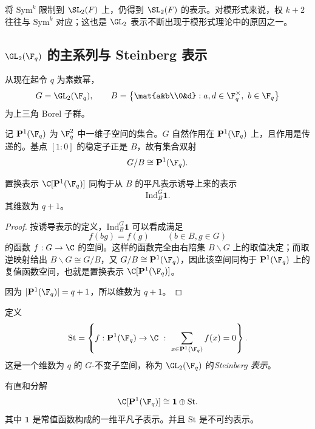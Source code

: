 \begin{remark}
将 $\mathrm{Sym}^k$ 限制到 $\SL_2(F)$ 上，仍得到 $\SL_2(F)$ 的表示。对模形式来说，权 $k+2$ 往往与 $\mathrm{Sym}^k$ 对应；这也是 $\GL_2$ 表示不断出现于模形式理论中的原因之一。
\end{remark}

\subsection*{$\GL_2(\F_q)$ 的主系列与 Steinberg 表示}

从现在起令 $q$ 为素数幂，
\[
G=\GL_2(\F_q),
\qquad
B=\left\{\mat{a&b\\0&d}:a,d\in \F_q^{\times},\ b\in \F_q\right\}
\]
为上三角 Borel 子群。

记 $\mathbf{P}^1(\F_q)$ 为 $\F_q^2$ 中一维子空间的集合。$G$ 自然作用在 $\mathbf{P}^1(\F_q)$ 上，且作用是传递的。基点 $[1:0]$ 的稳定子正是 $B$，故有集合双射
\[
G/B\cong \mathbf{P}^1(\F_q).
\]

\begin{proposition}
置换表示 $\C[\mathbf{P}^1(\F_q)]$ 同构于从 $B$ 的平凡表示诱导上来的表示
\[
\mathrm{Ind}_B^G \mathbf{1}.
\]
其维数为 $q+1$。
\end{proposition}

\begin{proof}
按诱导表示的定义，$\mathrm{Ind}_B^G\mathbf{1}$ 可以看成满足
\[
 f(bg)=f(g)\qquad (b\in B,g\in G)
\]
的函数 $f:G\to \C$ 的空间。这样的函数完全由右陪集 $B\backslash G$ 上的取值决定；而取逆映射给出 $B\backslash G\cong G/B$，又 $G/B\cong \mathbf{P}^1(\F_q)$，因此该空间同构于 $\mathbf{P}^1(\F_q)$ 上的复值函数空间，也就是置换表示 $\C[\mathbf{P}^1(\F_q)]$。

因为 $|\mathbf{P}^1(\F_q)|=q+1$，所以维数为 $q+1$。
\end{proof}

\begin{definition}
定义
\[
\mathrm{St}=
\left\{f:\mathbf{P}^1(\F_q)\to \C\ :\ \sum_{x\in \mathbf{P}^1(\F_q)}f(x)=0\right\}.
\]
这是一个维数为 $q$ 的 $G$-不变子空间，称为 $\GL_2(\F_q)$ 的\emph{Steinberg 表示}。
\end{definition}

\begin{proposition}
有直和分解
\[
\C[\mathbf{P}^1(\F_q)]\cong \mathbf{1}\oplus \mathrm{St}.
\]
其中 $\mathbf{1}$ 是常值函数构成的一维平凡子表示。并且 $\mathrm{St}$ 是不可约表示。
\end{proposition}

